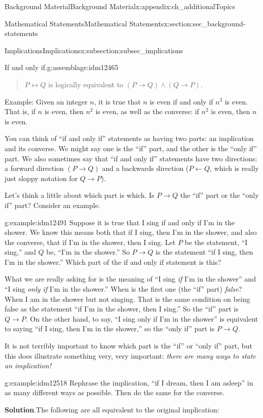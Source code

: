 \documentclass[oneside,10pt,]{book}
\numberwithin{equation}{chapter}
\def\iff{\leftrightarrow}
\def\imp{\rightarrow}
\begin{document}
\begin{appendixptx}{Background Material}{}{Background Material}{}{}{x:appendix:ch_additionalTopics}
\begin{sectionptx}{Mathematical Statements}{}{Mathematical Statements}{}{}{x:section:sec_background-statements}
\begin{subsectionptx}{Implications}{}{Implications}{}{}{x:subsection:subsec_implications}
\begin{assemblage}{If and only if.}{g:assemblage:idm12465}
\begin{quote}%
\(P \iff Q\) is logically equivalent to \((P \imp Q) \wedge (Q \imp P)\).%
\end{quote}
Example: Given an integer \(n\), it is true that \(n\) is even if and only if \(n^2\) is even. That is, if \(n\) is even, then \(n^2\) is even, as well as the converse: if \(n^2\) is even, then \(n\) is even.%
\end{assemblage}
You can think of ``if and only if'' statements as having two parts: an implication and its converse. We might say one is the ``if'' part, and the other is the ``only if'' part. We also sometimes say that ``if and only if'' statements have two directions: a forward direction \((P \imp Q)\) and a backwards direction (\(P \leftarrow Q\), which is really just sloppy notation for \(Q \imp P\)).%
\par
Let's think a little about which part is which. Is \(P \imp Q\) the ``if'' part or the ``only if'' part? Consider an example.%
\begin{example}{}{g:example:idm12491}%
Suppose it is true that I sing if and only if I'm in the shower. We know this means both that if I sing, then I'm in the shower, and also the converse, that if I'm in the shower, then I sing. Let \(P\) be the statement, ``I sing,'' and \(Q\) be, ``I'm in the shower.'' So \(P \imp Q\) is the statement ``if I sing, then I'm in the shower.'' Which part of the if and only if statement is this?%
\par
What we are really asking for is the meaning of ``I sing \emph{if} I'm in the shower'' and ``I sing \emph{only if} I'm in the shower.'' When is the first one (the ``if'' part) \emph{false}? When I am in the shower but not singing. That is the same condition on being false as the statement ``if I'm in the shower, then I sing.'' So the ``if'' part is \(Q \imp P\). On the other hand, to say, ``I sing only if I'm in the shower'' is equivalent to saying ``if I sing, then I'm in the shower,'' so the ``only if'' part is \(P \imp Q\).%
\end{example}
It is not terribly important to know which part is the ``if'' or ``only if'' part, but this does illustrate something very, very important: \emph{there are many ways to state an implication!}%
\begin{example}{}{g:example:idm12518}%
Rephrase the implication, ``if I dream, then I am asleep'' in as many different ways as possible. Then do the same for the converse.%
\par\smallskip%
\noindent\textbf{Solution}.\hypertarget{g:solution:idm12522}{}\quad{}The following are all equivalent to the original implication:%

\end{example}
\end{subsectionptx}
\end{sectionptx}
\end{appendixptx}
\end{document}
